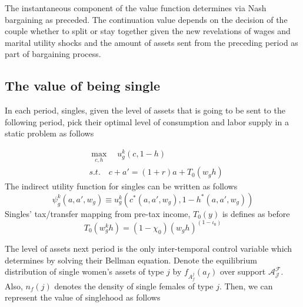 The instantaneous component of the value function determines via Nash bargaining as preceded. The continuation value depends on the decision of the couple whether to split or stay together given the new revelations of wages and marital utility shocks and the amount of assets sent from the preceding period as part of bargaining process. 

\subsection{The value of being single}
In each period, singles, given the level of assets that is going to be sent to the following period, pick their optimal level of consumption and labor supply in a static problem as follows 

\begin{align}
&\max_{c, h} \quad  u_g^k(c,1 - h) \label{intra_single} \\
& s.t. \quad c + a' = (1 + r)a + T_0(w_gh) \nonumber
\end{align}
The indirect utility function for singles can be written as follows 
\begin{equation}
\psi_g^k(a, a', w_g) \equiv u_g^k(c^*(a, a', w_g), 1 -h^*(a, a', w_g)) \label{indirect_single}
\end{equation}
Singles' tax/transfer mapping from pre-tax income, $T_0(y)$ is defines as before 
\begin{equation*}
T_0(w_g^k h) = (1-\chi_0) (w_g h)^{(1 - \iota_0)}
\end{equation*}

The level of assets next period is the only inter-temporal control variable which determines by solving their Bellman equation. Denote the equilibrium distribution of single women's assets of type $j$ by $f_{A_f^j}( a _f)$ over support $\mathcal{A_J^F}$. Also, $n_f(j)$ denotes the density of single females of type $j$. Then, we can represent the value of singlehood as follows 

